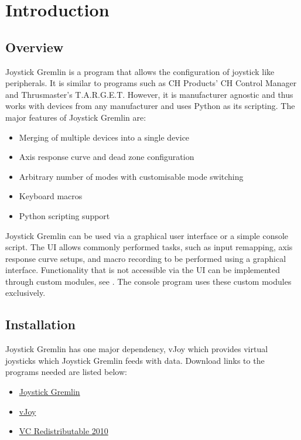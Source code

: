 \documentclass[a4, 10pt]{article}
\newcommand{\JG}{Joystick Gremlin}
\begin{document}


\tableofcontents
\newpage


\section{Introduction}
\label{sec:introduction}


\subsection{Overview}

\JG{} is a program that allows the configuration of joystick like
peripherals. It is similar to programs such as CH Products' CH Control
Manager and Thrusmaster's T.A.R.G.E.T. However, it is manufacturer
agnostic and thus works with devices from any manufacturer and uses
Python as its scripting. The major features of Joystick Gremlin are:
\begin{itemize}
    \item Merging of multiple devices into a single device
    \item Axis response curve and dead zone configuration
    \item Arbitrary number of modes with customisable mode switching
    \item Keyboard macros
    \item Python scripting support
\end{itemize}

\JG{} can be used via a graphical user interface or a simple console
script. The UI allows commonly performed tasks, such as input remapping,
axis response curve setups, and macro recording to be performed using a
graphical interface. Functionality that is not accessible via the UI can
be implemented through custom modules, see . The
console program uses these custom modules exclusively.


\subsection{Installation}
\JG{} has one major dependency, vJoy which provides virtual joysticks
which \JG{} feeds with data. Download links to the programs needed are
listed below:
\begin{itemize}
    \item \href{https://github.com/WhiteMagic/JoystickGremlin}{\JG{}}
    \item \href{http://vjoystick.sourceforge.net/site/}{vJoy}
    \item
        \href{http://www.microsoft.com/en-us/download/details.aspx?id=5555}{VC
        Redistributable 2010}
\end{itemize}
\end{document}
